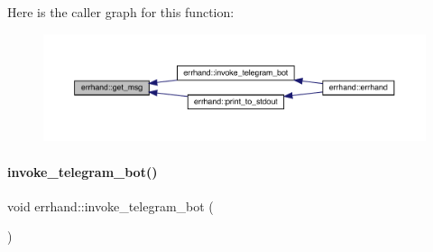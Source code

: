 Here is the caller graph for this function\+:\nopagebreak
\begin{figure}[H]
\begin{center}
\leavevmode
\includegraphics[width=350pt]{classerrhand_a524dfc6821f703329d8801dd3298f33f_icgraph}
\end{center}
\end{figure}
\mbox{\label{classerrhand_adbc86e81b391a68d2bf9a13529c977d3}} 
\paragraph{\texorpdfstring{invoke\+\_\+telegram\+\_\+bot()}{invoke\_telegram\_bot()}}
{\footnotesize\ttfamily void errhand\+::invoke\+\_\+telegram\+\_\+bot (\begin{DoxyParamCaption}{ }\end{DoxyParamCaption})\hspace{0.3cm}{\ttfamily [inline]}}

